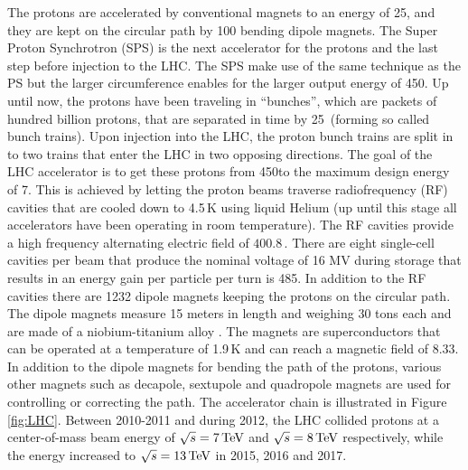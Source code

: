 The protons are accelerated by conventional magnets to an energy of 25\GeV, and they are kept on the circular path by 100 bending dipole magnets.
The Super Proton Synchrotron (SPS) is the next accelerator for the protons and the last step before injection to the LHC. 
The SPS make use of the same technique as the PS but the larger circumference enables for the larger output energy of 450\GeV.
\newpara
\noindent\justify
Up until now, the protons have been traveling in ``bunches'', which are packets of hundred billion protons, that are separated in time by 25\ns\ (forming so called bunch trains). 
Upon injection into the LHC, the proton bunch trains are split in to two trains that enter the LHC in two opposing directions. 
The goal of the LHC accelerator is to get these protons from 450\GeV to the maximum design energy of 7\TeV. 
This is achieved by letting the proton beams traverse radiofrequency (RF) cavities that are cooled down to 4.5$\,$K using liquid Helium (up until this stage all accelerators have been operating in room temperature). 
The RF cavities provide a high frequency alternating electric field of $400.8\,$\MHz.
There are eight single-cell cavities per beam that produce the nominal voltage of 16 MV during storage that results in an energy gain per particle per turn is 485\keV.   
In addition to the RF cavities there are 1232 dipole magnets keeping the protons on the circular path. 
The dipole magnets measure 15 meters in length and weighing 30 tons each and are made of a niobium-titanium alloy \cite{Boussard:1999rf}. 
The magnets are superconductors that can be operated at a temperature of 1.9$\,$K and can reach a magnetic field of 8.33\T. 
In addition to the dipole magnets for bending the path of the protons, various other magnets such as decapole, sextupole and quadropole magnets are used for controlling or correcting the path.      
The accelerator chain is illustrated in Figure \ref{fig:LHC}. 
Between 2010-2011 and during 2012, the LHC collided protons at a center-of-mass beam energy of $\sqrt{s}=7\,\text{Te\hspace{-.08em}V}$ and $\sqrt{s}=8\,\text{Te\hspace{-.08em}V}$ respectively, while the energy increased to $\sqrt{s}=13\,\text{Te\hspace{-.08em}V}$ in 2015, 2016 and 2017. 
